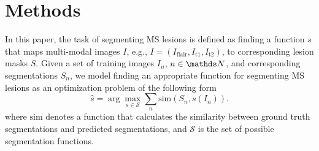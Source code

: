 \section{Methods}
\label{sec:method}

In this paper, the task of segmenting MS lesions is defined as finding a
function $s$ that maps multi-modal images $I$, e.g., $I = (I_\text{flair},
I_\text{t1}, I_\text{t2})$, to corresponding lesion masks $S$.
Given a set of training images $I_n$, $n \in \N$, and corresponding
segmentations $S_n$, we model finding an appropriate function for segmenting
MS lesions as an optimization problem of the following form
\begin{equation}
\hat{s} = \arg \max_{s \in \mathcal{S}} \sum_n \text{sim}(S_n, s(I_n)).
\label{eq:segprob}
\end{equation}
where $\text{sim}$ denotes a function that calculates the similarity between
ground truth segmentations and predicted segmentations, and $\mathcal{S}$ is the
set of possible segmentation functions.


% 
% 
% 

